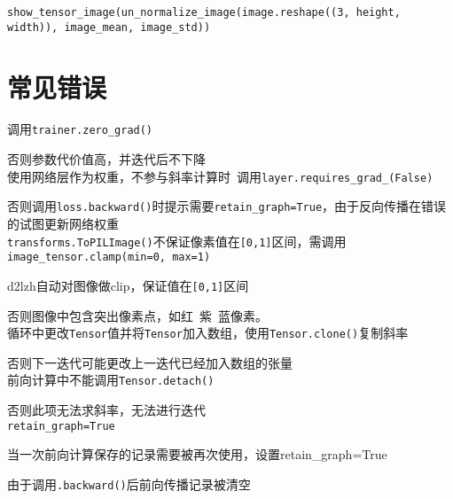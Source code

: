 \documentclass[UTF8]{ctexart}
\begin{document}
  \texttt{show\_tensor\_image(un\_normalize\_image(image.reshape((3, height, width)), image\_mean, image\_std))}

\section{常见错误}
\noindent 调用\texttt{trainer.zero\_grad()}

  否则参数代价值高，并迭代后不下降\\
使用网络层作为权重，不参与斜率计算时\ 调用\texttt{layer.requires\_grad\_(False)}

  否则调用\texttt{loss.backward()}时提示需要\texttt{retain\_graph=True}，由于反向传播在错误的试图更新网络权重\\
\texttt{transforms.ToPILImage()}不保证像素值在\texttt{[0,1]}区间，需调用\texttt{image\_tensor.clamp(min=0, max=1)}

  d2lzh自动对图像做clip，保证值在\texttt{[0,1]}区间
  
  否则图像中包含突出像素点，如红\ 紫\ 蓝像素。\\
循环中更改\texttt{Tensor}值并将\texttt{Tensor}加入数组，使用\texttt{Tensor.clone()}复制斜率

  否则下一迭代可能更改上一迭代已经加入数组的张量\\
前向计算中不能调用\texttt{Tensor.detach()}

  否则此项无法求斜率，无法进行迭代\\
\texttt{retain\_graph=True}

  当一次前向计算保存的记录需要被再次使用，设置retain\_graph=True 

  由于调用\texttt{.backward()}后前向传播记录被清空
\end{document}
